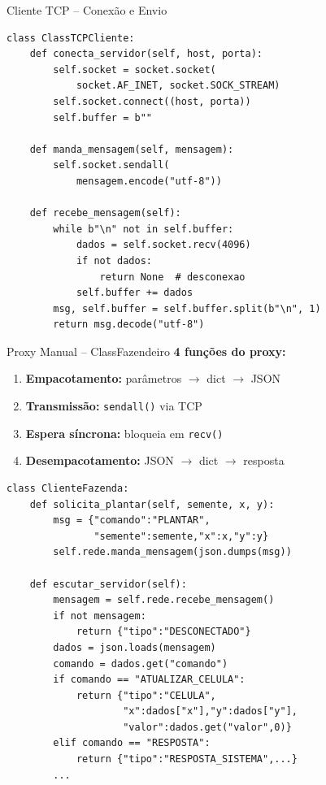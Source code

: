 \documentclass[aspectratio=169]{beamer}
\begin{document}
\begin{frame}[fragile, shrink=8]{Cliente TCP -- Conex\~ao e Envio}
\begin{lstlisting}[style=pycode, basicstyle=\ttfamily\footnotesize]
class ClassTCPCliente:
    def conecta_servidor(self, host, porta):
        self.socket = socket.socket(
            socket.AF_INET, socket.SOCK_STREAM)
        self.socket.connect((host, porta))
        self.buffer = b""

    def manda_mensagem(self, mensagem):
        self.socket.sendall(
            mensagem.encode("utf-8"))

    def recebe_mensagem(self):
        while b"\n" not in self.buffer:
            dados = self.socket.recv(4096)
            if not dados:
                return None  # desconexao
            self.buffer += dados
        msg, self.buffer = self.buffer.split(b"\n", 1)
        return msg.decode("utf-8")
\end{lstlisting}
\end{frame}

\begin{frame}[fragile, shrink=15]{Proxy Manual -- ClassFazendeiro}
  \textbf{4 fun\c{c}\~oes do proxy:}
  \begin{enumerate}
    \item \textbf{Empacotamento:} par\^ametros $\rightarrow$ dict $\rightarrow$ JSON
    \item \textbf{Transmiss\~ao:} \texttt{sendall()} via TCP
    \item \textbf{Espera s\'incrona:} bloqueia em \texttt{recv()}
    \item \textbf{Desempacotamento:} JSON $\rightarrow$ dict $\rightarrow$ resposta
  \end{enumerate}
\begin{lstlisting}[style=pycode, basicstyle=\ttfamily\scriptsize]
class ClienteFazenda:
    def solicita_plantar(self, semente, x, y):
        msg = {"comando":"PLANTAR",
               "semente":semente,"x":x,"y":y}
        self.rede.manda_mensagem(json.dumps(msg))

    def escutar_servidor(self):
        mensagem = self.rede.recebe_mensagem()
        if not mensagem:
            return {"tipo":"DESCONECTADO"}
        dados = json.loads(mensagem)
        comando = dados.get("comando")
        if comando == "ATUALIZAR_CELULA":
            return {"tipo":"CELULA",
                    "x":dados["x"],"y":dados["y"],
                    "valor":dados.get("valor",0)}
        elif comando == "RESPOSTA":
            return {"tipo":"RESPOSTA_SISTEMA",...}
        ...
\end{lstlisting}
\end{frame}
\end{document}
